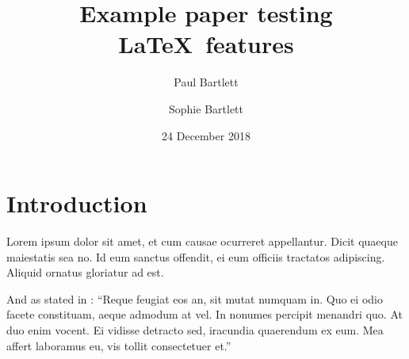 \documentclass[a4paper]{article}
\title{Example paper testing \LaTeX\ features}
\author{Paul Bartlett \and{Sophie Bartlett}}
\date{24 December 2018}
\begin{document}
\maketitle

\section{Introduction}
Lorem ipsum dolor sit amet, et cum causae ocurreret appellantur. Dicit quaeque maiestatis
sea no. Id eum sanctus offendit, ei eum officiis tractatos adipiscing. Aliquid ornatus gloriatur ad
est. \parencite{smith2013ex}

And as stated in \textcite{jones2009eg}: ``Reque feugiat eos an, sit mutat numquam in. Quo ei
odio facete constituam, aeque admodum at vel. In nonumes percipit menandri quo. At duo enim
vocent. Ei vidisse detracto sed, iracundia quaerendum ex eum. Mea affert laboramus eu, vis tollit
consectetuer et.''

\printbibliography 
\end{document}
